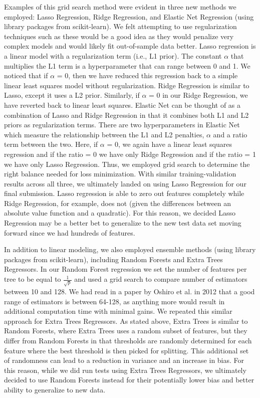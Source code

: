 \documentclass[11pt, oneside]{article}   	%
\begin{document}
Examples of this grid search method were evident in three new methods we employed: Lasso Regression, Ridge Regression, and Elastic Net Regression (using library packages from scikit-learn). We felt attempting to use regularization techniques such as these would be a good idea as they would penalize very complex models and would likely fit out-of-sample data better. Lasso regression is a linear model with a regularization term (i.e., L1 prior). The constant $\alpha$ that multiplies the L1 term is a hyperparameter that can range between 0 and 1. We noticed that if $\alpha$ = 0, then we have reduced this regression back to a simple linear least squares model without regularization. Ridge Regression is similar to Lasso, except it uses a L2 prior. Similarly, if $\alpha$ = 0 in our Ridge Regression, we have reverted back to linear least squares. Elastic Net can be thought of as a combination of Lasso and Ridge Regression in that it combines both L1 and L2 priors as regularization terms. There are two hyperparameters in Elastic Net which measure the relationship between the L1 and L2 penalties, $\alpha$ and a ratio term between the two. Here, if $\alpha$ = 0, we again have a linear least squares regression and if the ratio = 0 we have only Ridge Regression and if the ratio = 1 we have only Lasso Regression. Thus, we employed grid search to determine the right balance needed for loss minimization. With similar training-validation results across all three, we ultimately landed on using Lasso Regression for our final submission. Lasso regression is able to zero out features completely while Ridge Regression, for example, does not (given the differences between an absolute value function and a quadratic). For this reason, we decided Lasso Regression may be a better bet to generalize to the new test data set moving forward since we had hundreds of features. 

In addition to linear modeling, we also employed ensemble methods (using library packages from scikit-learn), including Random Forests and Extra Trees Regressors. In our Random Forest regression we set the number of features per tree to be equal to $\frac{1}{\sqrt{p}}$ and used a grid search to compare number of estimators between 10 and 128. We had read in a paper by Oshiro et al. in 2012 that a good range of estimators is between 64-128, as anything more would result in additional computation time with minimal gains. We repeated this similar approach for Extra Trees Regressors. As stated above, Extra Trees is similar to Random Forests, where Extra Trees uses a random subset of features, but they differ from Random Forests in that thresholds are randomly determined for each feature where the  best threshold is then picked for splitting. This additional set of randomness can lead to a reduction in variance and an increase in bias. For this reason, while we did run tests using Extra Trees Regressors, we ultimately decided to use Random Forests instead for their potentially lower bias and better ability to generalize to new data. 
\end{document}
